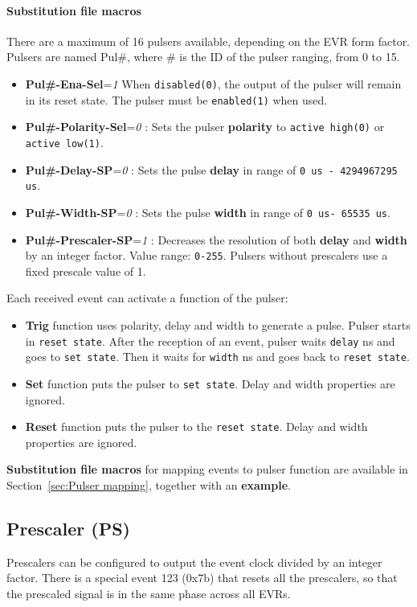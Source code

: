 \documentclass[12pt,a4paper]{article}
\begin{document}
\paragraph{Substitution file macros}
There are a maximum of 16 pulsers available, depending on the EVR form factor. Pulsers are named Pul\#, where \# is the ID of the pulser ranging, from 0 to 15.
\begin{itemize}
  \item
    \textbf{Pul\#-Ena-Sel}=\emph{1} When \texttt{disabled(0)}, the output
    of the pulser will remain in its reset state. The pulser must be
    \texttt{enabled(1)} when used.
  \item
    \textbf{Pul\#-Polarity-Sel}=\emph{0} : Sets the pulser \textbf{polarity} to \texttt{active high(0)} or \texttt{active low(1)}.
  \item
    \textbf{Pul\#-Delay-SP}=\emph{0} : Sets the pulse \textbf{delay} in range of \texttt{0 us - 4294967295 us}.
  \item
    \textbf{Pul\#-Width-SP}=\emph{0} : Sets the pulse \textbf{width} in range of \texttt{0 us- 65535 us}.
  \item
    \textbf{Pul\#-Prescaler-SP}=\emph{1} : Decreases the resolution of
    both \textbf{delay} and \textbf{width} by an integer factor. Value range:
    \texttt{0-255}. Pulsers without prescalers use a fixed prescale
    value of 1.
  \end{itemize}

Each received event can activate a function of the pulser:
\begin{itemize}
	\item \textbf{Trig} function uses polarity, delay and width to generate a pulse. Pulser starts in \texttt{reset state}. After the reception of an event, pulser waits \texttt{delay} ns and goes to \texttt{set state}. Then it waits for \texttt{width} ns and goes back to \texttt{reset state}.
	\item \textbf{Set} function puts the pulser to \texttt{set state}. Delay and width properties are ignored.
	\item \textbf{Reset} function puts the pulser to the \texttt{reset state}. Delay and width properties are ignored.
\end{itemize}

\textbf{Substitution file macros} for mapping events to pulser function are available in Section~\ref{sec:Pulser mapping}, together with an \textbf{example}.

\subsection{Prescaler (PS)}\label{sec:Prescaler}
Prescalers can be configured to output the event clock divided by an integer factor. There is a special event 123 (0x7b) that resets all the prescalers, so that the prescaled signal is in the same phase across all EVRs.
\end{document}
